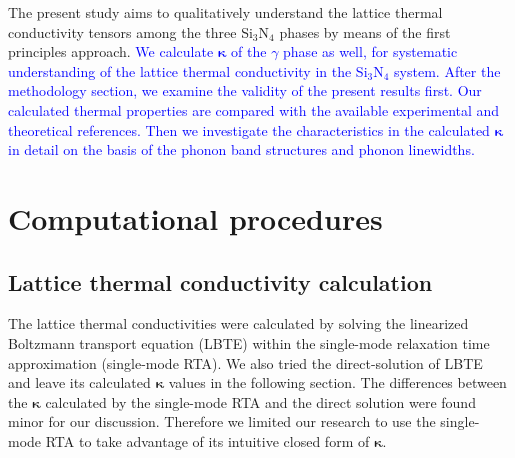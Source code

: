 \documentclass[twocolumn,amsmath,amssymb,a4paper,prb,superscriptaddress,floatfix]{revtex4-1}
\begin{document}
The present study aims to qualitatively understand the lattice thermal
conductivity tensors among the three Si$_3$N$_4$ phases by means of the first
principles approach.  \textcolor{blue}{We calculate $\boldsymbol{\kappa}$ of
the $\gamma$ phase as well, for systematic understanding of the lattice
thermal conductivity in the Si$_3$N$_4$ system.  After the methodology
section, we examine the validity of the present results first.  Our
calculated thermal properties are compared with the available experimental
and theoretical references.  Then we investigate the characteristics in the
calculated $\boldsymbol{\kappa}$ in detail on the basis of the phonon band
structures and phonon linewidths.}

\section{Computational procedures}

\subsection{Lattice thermal conductivity calculation}

The lattice thermal conductivities were calculated by solving the linearized
Boltzmann transport equation (LBTE) within the single-mode relaxation time
approximation (single-mode RTA).  We also tried the direct-solution of
LBTE~\cite{chaput-direct} and leave its calculated $\boldsymbol{\kappa}$ values
in the following section. The differences between the
$\boldsymbol{\kappa}$ calculated by the single-mode RTA and the direct solution
were found minor for our discussion. Therefore we limited our research to use
the single-mode RTA to take advantage of its intuitive closed form of
$\boldsymbol{\kappa}$.
\end{document}
